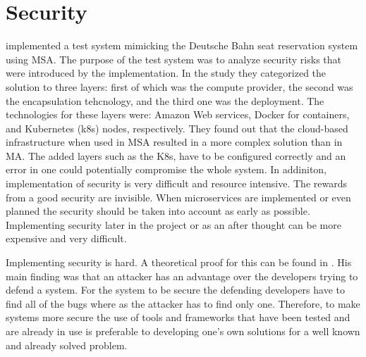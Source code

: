 

\section{Security}
\begin{sloppypar}
    \citet{closer18} implemented a test system mimicking the Deutsche Bahn 
    seat reservation system using MSA. The purpose of the test system was to
    analyze security risks that were introduced by the implementation. In the 
    study they categorized the solution to three layers: first of which was the 
    compute provider, the second was the encapsulation tehcnology, and the 
    third one was the deployment. The technologies for these layers were: 
    Amazon Web services, Docker for containers, and Kubernetes (k8s) nodes, 
    respectively. They found out that the cloud-based infrastructure when used 
    in MSA resulted in a more complex solution than in MA. The added layers 
    such as the K8s, have to be configured correctly and an error in one could 
    potentially compromise the whole system. In addiniton, implementation of 
    security is very difficult and resource intensive. The rewards from a good 
    security are invisible. When microservices are implemented or even planned 
    the security should be taken into account as early as possible. 
    Implementing security later in the project or as an after thought can be 
    more expensive and very difficult.
\end{sloppypar}
\begin{sloppypar}
    Implementing security is hard. A theoretical proof for this can be found in 
    \citet{andersson2001information}. His main finding was that an attacker has 
    an advantage over the developers trying to defend a system. For the system 
    to be secure the defending developers have to find all of the bugs where as 
    the attacker has to find only one. Therefore, to make systems more secure 
    the use of tools and frameworks that have been tested and are already in 
    use is preferable to developing one's own solutions for a well known and 
    already solved problem.
\end{sloppypar}




